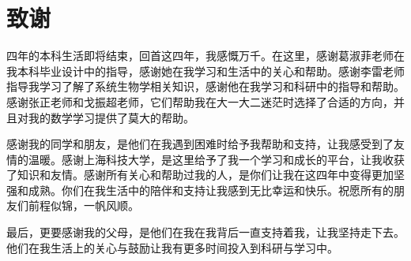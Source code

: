%
%
%
%
%
%
%
%
%
%
%
%

\chapter[致谢]{致\quad 谢}%
四年的本科生活即将结束，回首这四年，我感慨万千。在这里，感谢葛淑菲老师在我本科毕业设计中的指导，感谢她在我学习和生活中的关心和帮助。感谢李雷老师指导我学习了解了系统生物学相关知识，感谢他在我学习和科研中的指导和帮助。感谢张正老师和戈振超老师，它们帮助我在大一大二迷茫时选择了合适的方向，并且对我的数学学习提供了莫大的帮助。

感谢我的同学和朋友，是他们在我遇到困难时给予我帮助和支持，让我感受到了友情的温暖。感谢上海科技大学，是这里给予了我一个学习和成长的平台，让我收获了知识和友情。感谢所有关心和帮助过我的人，是你们让我在这四年中变得更加坚强和成熟。你们在我生活中的陪伴和支持让我感到无比幸运和快乐。祝愿所有的朋友们前程似锦，一帆风顺。

最后，更要感谢我的父母，是他们在我在我背后一直支持着我，让我坚持走下去。他们在我生活上的关心与鼓励让我有更多时间投入到科研与学习中。
\pagestyle{mainmatterstyle} %
\cleardoublepage[plain]%

